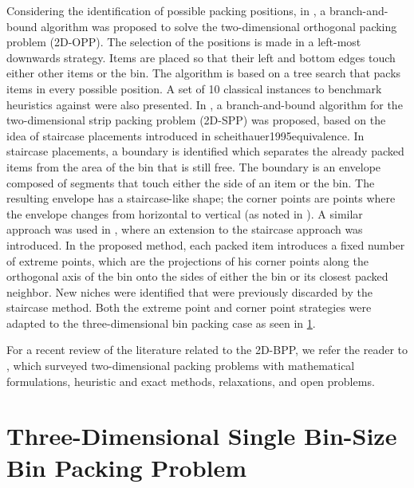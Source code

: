 Considering the identification of possible packing positions, in \cite{Martello1998}, a branch-and-bound algorithm was proposed to solve the two-dimensional orthogonal packing problem (2D-OPP).
The selection of the positions is made in a left-most downwards strategy. Items are placed so that their left and bottom edges touch either other items or the bin.
The algorithm is based on a tree search that packs items in every possible position.
A set of 10 classical instances to benchmark heuristics against were also presented.
In \cite{martello2003exact}, a branch-and-bound algorithm for the two-dimensional strip packing problem (2D-SPP) was proposed, based on the idea of staircase placements introduced in scheithauer1995equivalence.
In staircase placements, a boundary is identified which separates the already packed items from the area of the bin that is still free.
The boundary is an envelope composed of segments that touch either the side of an item or the bin.
The resulting envelope has a staircase-like shape; the corner points are points where the envelope changes from horizontal to vertical (as noted in \citep{martello2000three}).
A similar approach was used in \cite{crainic2008extreme}, where an extension to the staircase approach was introduced.
In the proposed method, each packed item introduces a fixed number of extreme points, which are the projections of his corner points along the orthogonal axis of the bin onto the sides of either the bin or its closest packed neighbor.
New niches were identified that were previously discarded by the staircase method.
Both the extreme point and corner point strategies were adapted to the three-dimensional bin packing case as seen in \cref{sec:literature:3dbpp}.

For a recent review of the literature related to the 2D-BPP, we refer the reader to \cite{IORI2021399}, which surveyed two-dimensional packing problems with mathematical formulations, heuristic and exact methods, relaxations, and open problems.

\section{Three-Dimensional Single Bin-Size Bin Packing Problem}
\label{sec:literature:3dbpp}%

